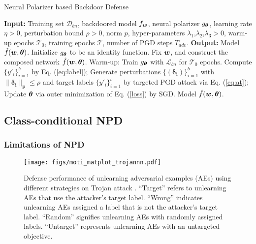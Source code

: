 \begin{algorithm}[h]
\caption{Neural Polarizer based Backdoor Defense}\label{alg1_npd}
\begin{algorithmic}[1]
\STATE \textbf{Input:} Training set $\mathcal{D}_{bn}$, backdoored model $f_{\bm{w}}$, neural polarizer $g_{\bm{\theta}}$, learning rate $\eta>0$, perturbation bound $\rho>0$, norm $p$, hyper-parameters $\lambda_1$,$\lambda_2$,$\lambda_3>0$, warm-up epochs $\mathcal{T}_0$, training epochs $\mathcal{T}$, number of PGD steps $T_{adv}$.
\vspace{-4mm}
\STATE \textbf{Output:} Model $\hat{f}(\bm{w},\bm{\theta})$.
\STATE Initialize $g_{\bm{\theta}}$ to be an identity function. Fix $\bm{w}$, and construct the composed network $\hat{f}(\bm{w},\bm{\theta})$.
\STATE Warm-up: Train $g_{\bm{\theta}}$ with $\mathcal{L}_{bn}$ for $\mathcal{T}_0$ epochs.
\STATE Compute $\{y'_i\}_{i=1}^{b}$ by Eq. (\ref{eq:label}); 
\STATE Generate perturbations $\{(\boldsymbol{\delta_i})\}_{i=1}^{b}$ with $\boldsymbol{\|\delta_{i}\|_p}\leq \rho$ and target labels $\{y'_i\}_{i=1}^{b}$ by targeted PGD attack \cite{madry2017towards} via Eq. (\ref{eq:at});
\STATE Update $\bm{\theta}$ via outer minimization of Eq. (\ref{loss}) by SGD.
\ENDFOR
\ENDFOR
\RETURN Model $\hat{f}(\bm{w},\bm{\theta})$. 
\end{algorithmic}
\end{algorithm}


\subsection{Class-conditional NPD\label{sec3.3}}
\subsubsection{Limitations of NPD\label{sec3.3.1}}
\begin{figure}[h]
\centering
\vspace{0.5em}
\texttt{[image: figs/moti\_matplot\_trojannn.pdf]}
\caption{Defense performance of unlearning adversarial examples (AEs) using different strategies on Trojan attack \cite{Trojannn}. ``Target'' refers to unlearning AEs that use the attacker's target label. ``Wrong'' indicates unlearning AEs assigned a label that is not the attacker's target label. ``Random'' signifies unlearning AEs with randomly assigned labels. ``Untarget'' represents unlearning AEs with an untargeted objective.}
\label{moti}
\end{figure}

